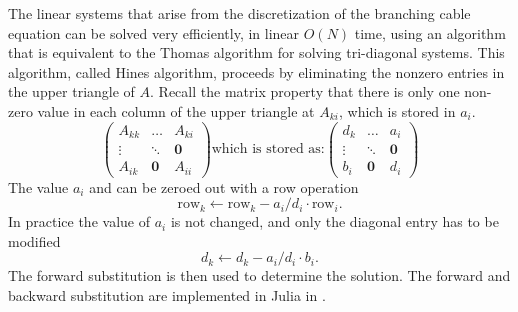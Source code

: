 The linear systems that arise from the discretization of the branching cable equation can be solved very efficiently, in linear $O(N)$ time, using an algorithm that is equivalent to the Thomas algorithm for solving tri-diagonal systems. This algorithm, called Hines algorithm, proceeds by eliminating the nonzero entries in the upper triangle of $A$. Recall the matrix property that there is only one non-zero value in each column of the upper triangle
 at $A_{ki}$, which is stored in $a_i$.
\begin{equation}
\left(
        \begin{array}{ccc}
            A_{kk} & \dots      & A_{ki} \\
        \vdots     & \ddots     & \mathbf{0} \\
            A_{ik} & \mathbf{0} & A_{ii}
        \end{array}
\right)
\text{which is stored as:}
\left(
        \begin{array}{ccc}
            d_k & \dots      & a_i \\
        \vdots  & \ddots     & \mathbf{0} \\
            b_i & \mathbf{0} & d_i
        \end{array}
\right)
\end{equation}
The value $a_i$ and can be zeroed out with a row operation
\begin{equation*}
    \text{row}_k \leftarrow \text{row}_k - a_i/d_i\cdot\text{row}_i.
\end{equation*}
In practice the value of $a_i$ is not changed, and only the diagonal entry has to be modified
\begin{equation*}
d_k \leftarrow d_k - a_i/d_i\cdot b_i.
\end{equation*}
The forward substitution is then used to determine the solution. The forward and backward substitution are implemented in Julia in .


